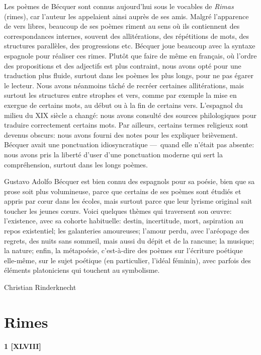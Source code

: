 \documentclass[a4paper,12pt]{book}
\begin{document}
Les poèmes de Bécquer sont connus aujourd'hui sous le vocables de
\emph{Rimas} (rimes), car l'auteur les appelaient ainsi auprès de ses
amis. Malgré l'apparence de vers libres, beaucoup de ses poèmes riment
au sens où ils contiennent des correspondances internes, souvent des
allitérations, des répétitions de mots, des structures parallèles, des
progressions etc. Bécquer joue beaucoup avec la syntaxe espagnole pour
réaliser ces rimes. Plutôt que faire de même en français, où l'ordre
des propositions et des adjectifs est plus contraint, nous avons opté
pour une traduction plus fluide, surtout dans les poèmes les plus
longs, pour ne pas égarer le lecteur. Nous avons néanmoins tâché de
recréer certaines allitérations, mais surtout les structures entre
strophes et vers, comme par exemple la mise en exergue de certains
mots, au début ou à la fin de certains vers. L'espagnol du milieu du
XIX\ieme{} siècle a changé: nous avons consulté des sources
philologiques pour traduire correctement certains mots. Par ailleurs,
certains termes religieux sont devenus obscurs: nous avons fourni des
notes pour les expliquer brièvement. Bécquer avait une ponctuation
idiosyncratique ---~quand elle n'était pas absente: nous avons pris la
liberté d'user d'une ponctuation moderne qui sert la compréhension,
surtout dans les longs poèmes.

Gustavo Adolfo Bécquer est bien connu des espagnols pour sa poésie,
bien que sa prose soit plus volumineuse, parce que certains de ses
poèmes sont étudiés et appris par cœur dans les écoles, mais surtout
parce que leur lyrisme original sait toucher les jeunes cœurs. Voici
quelques thèmes qui traversent son œuvre: l'existence, avec sa cohorte
habituelle: destin, incertitude, mort, aspiration au repos
existentiel; les galanteries amoureuses; l'amour perdu, avec
l'aréopage des regrets, des nuits sans sommeil, mais aussi du dépit et
de la rancune; la musique; la nature; enfin, la métapoésie,
c'est-à-dire des poèmes sur l'écriture poétique elle-même, sur le
sujet poétique (en particulier, l'idéal féminin), avec parfois des
éléments platoniciens qui touchent au symbolisme.

\bigskip
\bigskip
\bigskip
\bigskip
\hfill Christian Rinderknecht

\chapter{Rimes}


\begin{center}
  \textbf{1 [XLVIII]}
\end{center}
\end{document}
